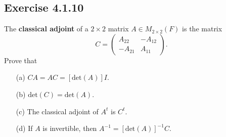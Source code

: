 \subsection*{Exercise 4.1.10} The \textbf{classical adjoint} of a \( 2 \times 2  \) matrix \( A \in {M}_{2 \times 2}(F)  \) is the matrix 
\[  C = \begin{pmatrix}
    {A}_{22} & - {A}_{12} \\
    - {A}_{21} & {A}_{11}
\end{pmatrix}. \]
Prove that
\begin{enumerate}
    \item[(a)] \( CA = AC = [\text{det}(A)] I. \)
    \item[(b)] \( \text{det}(C) = \text{det}(A) \).
    \item[(c)] The classical adjoint of \( A^{t} \) is \( C^{t} \).
    \item[(d)] If \( A  \) is invertible, then \( A^{-1} = [\text{det}(A)]^{-1} C \).
\end{enumerate}

